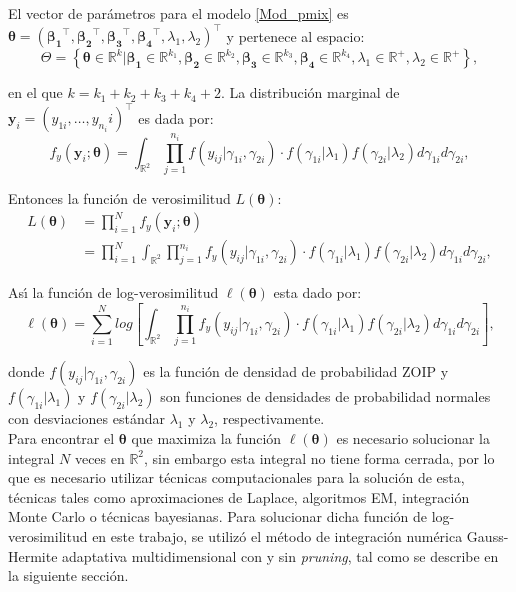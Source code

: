 El vector de par\'{a}metros para el modelo \eqref{Mod_pmix} es $\boldsymbol{\theta}=(\boldsymbol{\beta_1}^{\top},\boldsymbol{\beta_2}^{\top},\boldsymbol{\beta_3}^{\top}, \boldsymbol{\beta_4}^{\top},\lambda_1,\lambda_2)^{\top}$ y pertenece al espacio:
\[
\Theta=\left\{\boldsymbol{\theta} \in \mathbb{R}^k | \boldsymbol{\beta_1} \in \mathbb{R}^{k_1}, \boldsymbol{\beta_2} \in \mathbb{R}^{k_2}, \boldsymbol{\beta_3} \in \mathbb{R}^{k_3}, \boldsymbol{\beta_4} \in \mathbb{R}^{k_4}, \lambda_1 \in \mathbb{R}^+, \lambda_2 \in \mathbb{R}^+  \right\},
\]

en el que $k=k_1+k_2+k_3+k_4+2$. La distribuci\'{o}n marginal de $\mathbf{y}_i=(y_{1i},\ldots, y_{n_i}i)^{\top}$ es dada por:
\[
f_y(\mathbf{y}_i;\boldsymbol{\theta})=\int_{\mathbb{R}^2}\prod_{j=1}^{n_i}f(y_{ij}|\gamma_{1i},\gamma_{2i})\cdot f(\gamma_{1i}|\lambda_1) f(\gamma_{2i}|\lambda_2) d\gamma_{1i}d\gamma_{2i},
\]

Entonces la funci\'{o}n de verosimilitud $L(\boldsymbol{\theta})$:
\begin{align*}
L(\boldsymbol{\theta}) &= \prod_{i=1}^{N}f_y(\mathbf{y}_i;\boldsymbol{\theta})\\
&= \prod_{i=1}^{N}\int_{\mathbb{R}^2}\prod_{j=1}^{n_i}f_y(y_{ij}|\gamma_{1i},\gamma_{2i})\cdot f(\gamma_{1i}|\lambda_1) f(\gamma_{2i}|\lambda_2) d\gamma_{1i}d\gamma_{2i},
\end{align*}

As\'{\i} la funci\'{o}n de log-verosimilitud $\ell(\boldsymbol{\theta})$ esta dado por:
\begin{equation}
\ell(\boldsymbol{\theta})=\sum_{i=1}^{N}log \left[\int_{\mathbb{R}^2}\prod_{j=1}^{n_i}f_y(y_{ij}|\gamma_{1i},\gamma_{2i})\cdot f(\gamma_{1i}|\lambda_1) f(\gamma_{2i}|\lambda_2) d\gamma_{1i}d\gamma_{2i}\right],
 \label{func_ver_mix}
\end{equation}


donde $f(y_{ij}|\gamma_{1i},\gamma_{2i})$ es la funci\'{o}n de densidad de probabilidad ZOIP y $f(\gamma_{1i}|\lambda_1)$ y $f(\gamma_{2i}|\lambda_2)$ son funciones de densidades de probabilidad normales con desviaciones est\'{a}ndar $\lambda_1$ y $\lambda_2$, respectivamente.\\

Para encontrar el $\boldsymbol{\theta}$ que maximiza la funci\'{o}n $\ell(\boldsymbol{\theta})$ es necesario solucionar la integral $N$ veces en $\mathbb{R}^2$, sin embargo esta integral no tiene forma cerrada, por lo que es necesario utilizar t\'{e}cnicas computacionales para la soluci\'{o}n de esta, t\'{e}cnicas tales como aproximaciones de Laplace, algoritmos EM, integraci\'{o}n Monte Carlo o t\'{e}cnicas bayesianas. Para solucionar dicha funci\'{o}n de log-verosimilitud en este trabajo, se utiliz\'{o} el m\'{e}todo de integraci\'{o}n num\'{e}rica Gauss-Hermite adaptativa multidimensional con y sin \textit{pruning}, tal como se describe en la siguiente secci\'{o}n.


